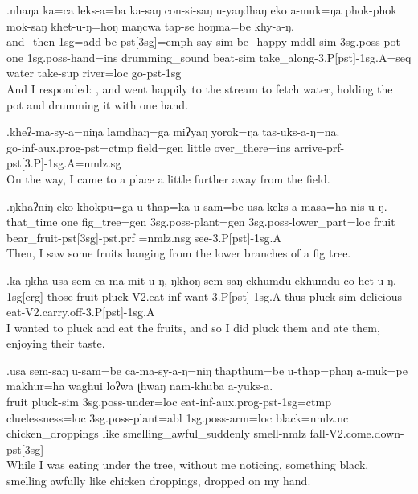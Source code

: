 \exg.nhaŋa   ka=ca         leks-a=ba                ka-saŋ       con-si-saŋ                    u-yaŋdhaŋ eko a-muk=ŋa             phok-phok      mok-saŋ       khet-u-ŋ=hoŋ                      maŋcwa tap-se         hoŋma=be    khy-a-ŋ.\\
 and\_then {\sc 1sg=add} be{\sc -pst[3sg]=emph} say{\sc -sim} be\_happy{\sc -mddl-sim} {\sc 3sg.poss-}pot
 one {\sc 1sg.poss-}hand{\sc =ins} drumming\_sound beat{\sc -sim} take\_along{\sc -3.P[pst]-1sg.A=seq}  water   take{\sc -sup} river{\sc =loc} go{\sc -pst-1sg}\\
And I responded: , and went happily to the stream to fetch water, holding the pot and drumming it with one hand.

\exg.kheʔ-ma-sy-a=niŋa                  lamdhaŋ=ga    miʔyaŋ yorok=ŋa        tas-uks-a-ŋ=na.\\
 go{\sc -inf-aux.prog-pst=ctmp} field{\sc =gen} little   over\_there{\sc =ins} arrive{\sc -prf-pst[3.P]-1sg.A=nmlz.sg}\\
On the way, I came to a place a little further away from the field.

\exg.ŋkhaʔniŋ eko khokpu=ga      u-thap=ka              u-sam=be                    usa   keks-a-masa=ha                               nis-u-ŋ.\\
 that\_time   one fig\_tree{\sc =gen} {\sc 3sg.poss-}plant{\sc =gen} {\sc 3sg.poss-}lower\_part{\sc =loc} fruit bear\_fruit{\sc -pst[3sg]-pst.prf =nmlz.nsg} see{\sc -3.P[pst]-1sg.A}\\
Then, I saw some fruits hanging from the lower branches of a fig tree.

\exg.ka  ŋkha usa   sem-ca-ma            mit-u-ŋ,               ŋkhoŋ sem-saŋ        ekhumdu-ekhumdu co-het-u-ŋ.\\
 {\sc 1sg[erg]} those fruit pluck{\sc -V2.eat-inf} want{\sc -3.P[pst]-1sg.A} thus    pluck{\sc -sim} delicious       eat{\sc -V2.carry.off-3.P[pst]-1sg.A}\\
I wanted to pluck and eat the fruits, and so I did pluck them and ate them, enjoying their taste.

\exg.usa   sem-saŋ u-sam=be  ca-ma-sy-a-ŋ=niŋ   thapthum=be  u-thap=phaŋ a-muk=pe    makhur=ha             waghui     loʔwa ʈhwaŋ     nam-khuba        a-yuks-a.\\
 fruit pluck{\sc -sim} {\sc 3sg.poss-}under{\sc =loc} eat{\sc -inf-aux.prog-pst-1sg=ctmp} cluelessness{\sc =loc} {\sc 3sg.poss-}plant{\sc =abl}  {\sc 1sg.poss-}arm{\sc =loc} black{\sc =nmlz.nc} chicken\_droppings like   smelling\_awful\_suddenly smell{\sc -nmlz} fall{\sc -V2.come.down-pst[3sg]}\\
While I was eating under the tree, without me noticing, something black, smelling awfully like chicken droppings, dropped on my hand.

